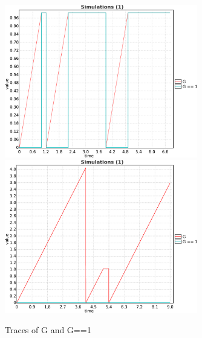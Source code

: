 \documentclass[12pt,a4paper]{article}
\begin{document}
\begin{figure}\centering
	\includegraphics[width=0.75\textwidth]{urgent-crop}\\
	\includegraphics[width=0.75\textwidth]{non-urgent-crop}
	\caption{Traces of G and G==1}
\end{figure}
\end{document}
